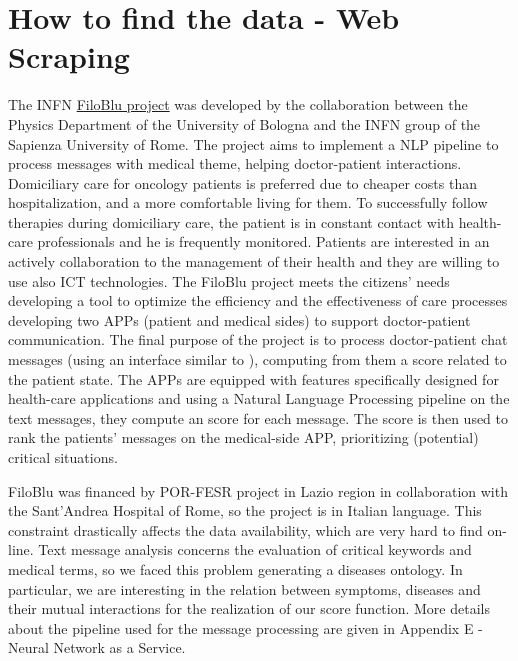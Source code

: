 \documentclass{standalone}
\begin{document}
\section[Web Scraping]{How to find the data - Web Scraping}\label{chimera:web_scraping}

The INFN \href{https://agenda.infn.it/event/16961/contributions/34949/attachments/24579/28029/filoblu_0312.pdf}{FiloBlu project} was developed by the collaboration between the Physics Department of the University of Bologna and the INFN group of the Sapienza University of Rome.
The project aims to implement a NLP pipeline to process messages with medical theme, helping doctor-patient interactions.
Domiciliary care for oncology patients is preferred due to cheaper costs than hospitalization, and a more comfortable living for them.
To successfully follow therapies during domiciliary care, the patient is in constant contact with health-care professionals and he is frequently monitored.
Patients are interested in an actively collaboration to the management of their health and they are willing to use also ICT technologies.
The FiloBlu project meets the citizens' needs developing a tool to optimize the efficiency and the effectiveness of care processes developing two APPs (patient and medical sides) to support doctor-patient communication.
The final purpose of the project is to process doctor-patient chat messages (using an interface similar to ), computing from them a score related to the patient state.
The APPs are equipped with features specifically designed for health-care applications and using a Natural Language Processing pipeline on the text messages, they compute an  score for each message.
The  score is then used to rank the patients' messages on the medical-side APP, prioritizing (potential) critical situations.

FiloBlu was financed by POR-FESR project in Lazio region in collaboration with the Sant'Andrea Hospital of Rome, so the project is in Italian language.
This constraint drastically affects the data availability, which are very hard to find on-line.
Text message analysis concerns the evaluation of critical keywords and medical terms, so we faced this problem generating a diseases ontology.
In particular, we are interesting in the relation between symptoms, diseases and their mutual interactions for the realization of our score function.
More details about the pipeline used for the message processing are given in Appendix E - Neural Network as a Service.
\end{document}
